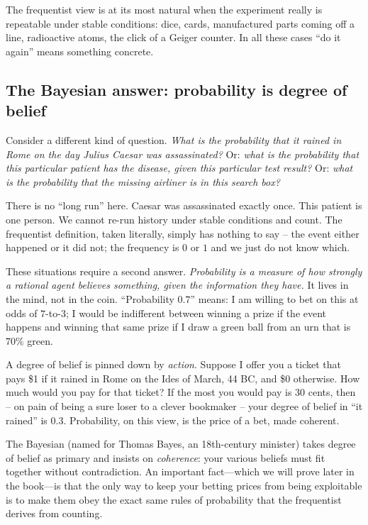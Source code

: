 The frequentist view is at its most natural when the experiment really is
repeatable under stable conditions: dice, cards, manufactured parts coming off a
line, radioactive atoms, the click of a Geiger counter. In all these cases ``do it
again'' means something concrete.

\subsection{The Bayesian answer: probability is degree of belief}
\label{ch01:bayesian}

Consider a different kind of question. \emph{What is the probability that it
rained in Rome on the day Julius Caesar was assassinated?} Or: \emph{what is the
probability that this particular patient has the disease, given this particular
test result?} Or: \emph{what is the probability that the missing airliner is in
this search box?}

There is no ``long run'' here. Caesar was assassinated exactly once. This patient
is one person. We cannot re-run history under stable conditions and count. The
frequentist definition, taken literally, simply has nothing to say -- the event
either happened or it did not; the frequency is $0$ or $1$ and we just do not know
which.

These situations require a second answer.
\emph{Probability is a measure of how strongly a rational agent believes
something, given the information they have.} It lives in the mind, not in the
coin. ``Probability $0.7$'' means: I am willing to bet on this at odds of
$7$-to-$3$; I would be indifferent between winning a prize if the event happens
and winning that same prize if I draw a green ball from an urn that is $70\%$
green.

\begin{intuitionbox}
A degree of belief is pinned down by
\emph{action}. Suppose I offer you a ticket that pays \$1 if it rained in Rome on
the Ides of March, 44 BC, and \$0 otherwise. How much would you pay for that
ticket? If the most you would pay is 30 cents, then -- on pain of being a sure
loser to a clever bookmaker -- your degree of belief in ``it rained'' is $0.3$.
Probability, on this view, is the price of a bet, made coherent.
\end{intuitionbox}

The Bayesian (named for Thomas Bayes, an 18th-century minister) takes degree of belief as primary and insists on \emph{coherence}: your various beliefs must fit together without contradiction. An important fact---which we will prove later in the book---is that the only way to keep your betting prices from being exploitable is to make them obey the exact same rules of probability that the frequentist derives from counting.

